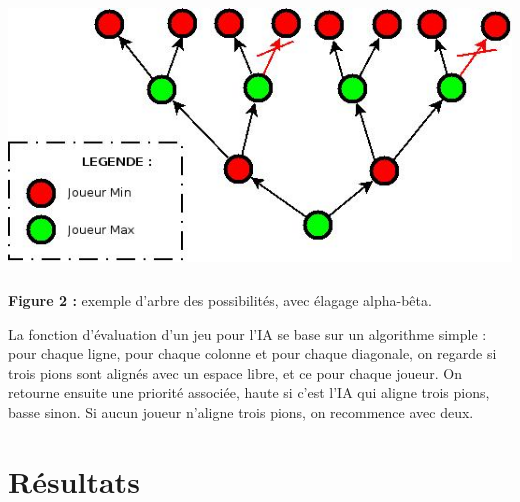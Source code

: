 \documentclass{report}
\begin{document}
        \begin{center}
            \includegraphics[width=16cm, height=8cm]{ressources/rapport/arbre_IA.jpeg} \\
            \textbf{Figure 2 :} exemple d'arbre des possibilités, avec élagage alpha-bêta.
        \end{center}
        \vspace{1cm}
        La fonction d'évaluation d'un jeu pour l'IA se base sur un algorithme simple : pour chaque ligne, pour chaque colonne et pour chaque diagonale, on regarde si trois pions sont 
            alignés avec un espace libre, et ce pour chaque joueur. On retourne ensuite une priorité associée, haute si c'est l'IA qui aligne trois pions, basse sinon. Si aucun joueur 
            n'aligne trois pions, on recommence avec deux.


\chapter{Résultats} %
\end{document}
